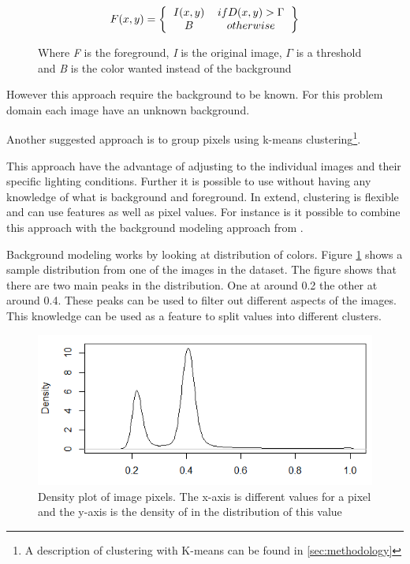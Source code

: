 \begin{figure}[H]
\begin{equation}
F(x,y) = \left \{
\begin{tabular}{cc}
$I(x,y)$ & $if D(x,y) > \Gamma$ \\
$B$      & $otherwise$
\end{tabular}  
\right \}
\end{equation}
\caption{Where \emph{F} is the foreground, \emph{I} is the original image, $\Gamma$ is a threshold and \emph{B} is the color wanted instead of the background}
\end{figure}

However this approach require the background to be known. For this problem domain each image have an unknown background.

Another suggested approach is to group pixels using k-means clustering\footnote{A description of clustering with K-means can be found in \ref{sec:methodology}}.

This approach have the advantage of adjusting to the individual images and their specific lighting conditions. Further it is possible to use without having any knowledge of what is background and foreground. 
In extend, clustering is flexible and can use features as well as pixel values.
For instance is it possible to combine this approach with the background modeling approach from \cite{backgroundRemoval}.
  
Background modeling works by looking at distribution of colors. Figure \ref{fig:pixeldistribution} shows a sample distribution from one of the images in the dataset. The figure shows that there are two main peaks in the distribution. One at around 0.2 the other at around 0.4. 
These peaks can be used to filter out different aspects of the images. This knowledge can be used as a feature to split values into different clusters.
 
\begin{figure}
\centering
\includegraphics[width=\linewidth]{Images/Distribution}
\caption{Density plot of image pixels. The x-axis is different values for a pixel and the y-axis is the density of in the distribution of this value}
\label{fig:pixeldistribution}
\end{figure}











